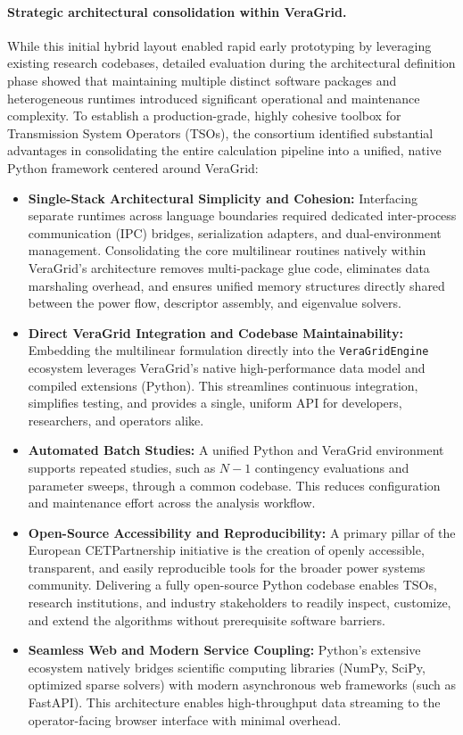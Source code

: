\paragraph{Strategic architectural consolidation within VeraGrid.}
While this initial hybrid layout enabled rapid early prototyping by leveraging existing research codebases, detailed evaluation during the architectural definition phase showed that maintaining multiple distinct software packages and heterogeneous runtimes introduced significant operational and maintenance complexity. To establish a production-grade, highly cohesive toolbox for Transmission System Operators (TSOs), the consortium identified substantial advantages in consolidating the entire calculation pipeline into a unified, native Python framework centered around VeraGrid:
\begin{itemize}[before=\leavevmode, leftmargin=*]
  \item \textbf{Single-Stack Architectural Simplicity and Cohesion:} Interfacing separate runtimes across language boundaries required dedicated inter-process communication (IPC) bridges, serialization adapters, and dual-environment management. Consolidating the core multilinear routines natively within VeraGrid's architecture removes multi-package glue code, eliminates data marshaling overhead, and ensures unified memory structures directly shared between the power flow, descriptor assembly, and eigenvalue solvers.
  \item \textbf{Direct VeraGrid Integration and Codebase Maintainability:} Embedding the multilinear formulation directly into the \texttt{VeraGridEngine} ecosystem leverages VeraGrid's native high-performance data model and compiled extensions (Python). This streamlines continuous integration, simplifies testing, and provides a single, uniform API for developers, researchers, and operators alike.
  \item \textbf{Automated Batch Studies:} A unified Python and VeraGrid environment supports repeated studies, such as $N-1$ contingency evaluations and parameter sweeps, through a common codebase. This reduces configuration and maintenance effort across the analysis workflow.
  \item \textbf{Open-Source Accessibility and Reproducibility:} A primary pillar of the European CETPartnership initiative is the creation of openly accessible, transparent, and easily reproducible tools for the broader power systems community. Delivering a fully open-source Python codebase enables TSOs, research institutions, and industry stakeholders to readily inspect, customize, and extend the algorithms without prerequisite software barriers.
  \item \textbf{Seamless Web and Modern Service Coupling:} Python's extensive ecosystem natively bridges scientific computing libraries (NumPy, SciPy, optimized sparse solvers) with modern asynchronous web frameworks (such as FastAPI). This architecture enables high-throughput data streaming to the operator-facing browser interface with minimal overhead.
\end{itemize}

